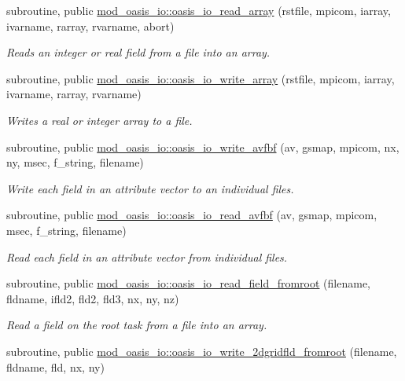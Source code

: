 \begin{DoxyCompactItemize}
subroutine, public \hyperlink{namespacemod__oasis__io_a8b604f89345d74c74c6bc3b4760b2e29}{mod\+\_\+oasis\+\_\+io\+::oasis\+\_\+io\+\_\+read\+\_\+array} (rstfile, mpicom, iarray, ivarname, rarray, rvarname, abort)
\begin{DoxyCompactList}\small\item\em Reads an integer or real field from a file into an array. \end{DoxyCompactList}\item 
subroutine, public \hyperlink{namespacemod__oasis__io_a9ac8ce0ba3223fb59f7f003b50b229cf}{mod\+\_\+oasis\+\_\+io\+::oasis\+\_\+io\+\_\+write\+\_\+array} (rstfile, mpicom, iarray, ivarname, rarray, rvarname)
\begin{DoxyCompactList}\small\item\em Writes a real or integer array to a file. \end{DoxyCompactList}\item 
subroutine, public \hyperlink{namespacemod__oasis__io_a42b325557a774b08d4cba24f387f8b01}{mod\+\_\+oasis\+\_\+io\+::oasis\+\_\+io\+\_\+write\+\_\+avfbf} (av, gsmap, mpicom, nx, ny, msec, f\+\_\+string, filename)
\begin{DoxyCompactList}\small\item\em Write each field in an attribute vector to an individual files. \end{DoxyCompactList}\item 
subroutine, public \hyperlink{namespacemod__oasis__io_ac4a465a698824fb473074bfbd3d92f79}{mod\+\_\+oasis\+\_\+io\+::oasis\+\_\+io\+\_\+read\+\_\+avfbf} (av, gsmap, mpicom, msec, f\+\_\+string, filename)
\begin{DoxyCompactList}\small\item\em Read each field in an attribute vector from individual files. \end{DoxyCompactList}\item 
subroutine, public \hyperlink{namespacemod__oasis__io_af080505b4678a5c68916a700f54ac6e6}{mod\+\_\+oasis\+\_\+io\+::oasis\+\_\+io\+\_\+read\+\_\+field\+\_\+fromroot} (filename, fldname, ifld2, fld2, fld3, nx, ny, nz)
\begin{DoxyCompactList}\small\item\em Read a field on the root task from a file into an array. \end{DoxyCompactList}\item 
subroutine, public \hyperlink{namespacemod__oasis__io_a18912324646473cf8fedd7138cc59a79}{mod\+\_\+oasis\+\_\+io\+::oasis\+\_\+io\+\_\+write\+\_\+2dgridfld\+\_\+fromroot} (filename, fldname, fld, nx, ny)

\end{DoxyCompactItemize}
